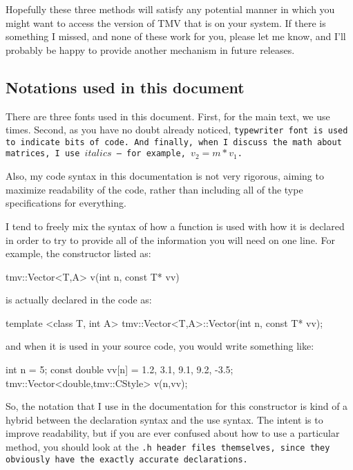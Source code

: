 Hopefully these three methods will satisfy any potential manner in which you might want 
to access the version of TMV that is on your system.  If there is something I missed, and 
none of these work for you, please
let me know, and I'll probably be happy to provide another mechanism in future releases.

\subsection {Notations used in this document}

There are three fonts used in this document.  First, for the main text, we use times.
Second, as you have no doubt already noticed, \tt{typewriter font} is used to 
indicate bits of code.  And finally, when I discuss the math about matrices, I 
use $italics$ -- for example, $v_2 = m * v_1$.

Also, my code syntax in this documentation is not very rigorous, aiming to maximize
readability of the code, rather than including all of the type specifications for everything.

I tend to freely mix the syntax of how a function is used with how
it is declared in order to try to provide all of the information you will need on one line.  
For example, the constructor listed as:
\begin{tmvcode}
tmv::Vector<T,A> v(int n, const T* vv)
\end{tmvcode}
is actually declared in the code as:
\begin{tmvcode}
template <class T, int A>
tmv::Vector<T,A>::Vector(int n, const T* vv);
\end{tmvcode}
and when it is used in your source code, you would write something like:
\begin{tmvcode}
int n = 5;
const double vv[n] = {1.2, 3.1, 9.1, 9.2, -3.5};
tmv::Vector<double,tmv::CStyle> v(n,vv);
\end{tmvcode}
So, the notation that I use in the documentation for this constructor is kind of a hybrid between the declaration syntax and the use syntax.  The intent is to improve readability, but
if you are ever confused about how to use a particular method, you should look at
the \tt{.h} header files themselves, since they obviously have the exactly accurate
declarations.  

